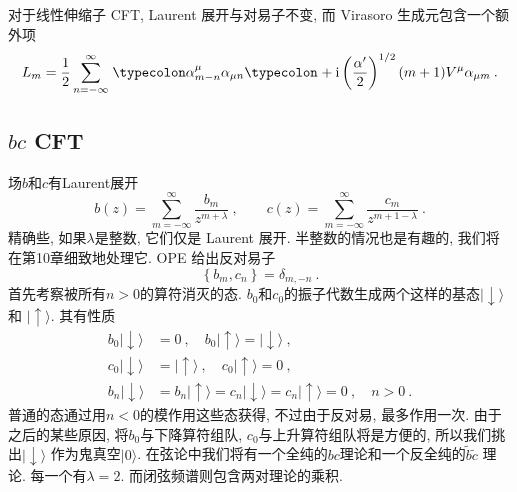 对于线性伸缩子 CFT, Laurent 展开与对易子不变, 而 Virasoro 生成元包含一个额外项
\begin{equation}
L_{m}=\frac{1}{2} \sum_{n=-\infty}^{\infty} \mathrel{\typecolon \alpha_{m-n}^{\mu} \alpha_{\mu n}\typecolon} + \:\mi\left(\frac{\alpha^{\prime}}{2}\right)^{1 / 2}(m+1) V^{\mu} \alpha_{\mu m} \:.
\end{equation}

\subsection*{ $bc$ CFT}

场$b$和$c$有Laurent展开
\begin{equation} \label{2.7.16}
b(z)=\sum_{m=-\infty}^{\infty} \frac{b_{m}}{z^{m+\lambda}}\:, \qquad c(z)=\sum_{m=-\infty}^{\infty} \frac{c_{m}}{z^{m+1-\lambda}} \:.
\end{equation}
精确些, 如果$\lambda$是整数, 它们仅是 Laurent 展开. 半整数的情况也是有趣的, 我们将在第10章细致地处理它. OPE 给出反对易子
\begin{equation}
\left\{b_{m}, c_{n}\right\}=\delta_{m,-n} \:. \label{2.7.17}
\end{equation}
首先考察被所有$n>0$的算符消灭的态. $b_0$和$c_0$的振子代数生成两个这样的基态$\lvert\downarrow\rangle$ 和 $\lvert\uparrow\rangle$. 其有性质
\begin{subequations} \label{2.7.18}
\begin{align}
b_{0}\lvert\downarrow\rangle &=0\:, \quad b_{0} \lvert \uparrow\rangle=\lvert\downarrow\rangle \:, \label{2.7.18a} \\
c_{0}\lvert\downarrow\rangle &=\lvert\uparrow\rangle \:, \quad c_{0}\lvert\uparrow\rangle=0 \:, \label{2.7.18b} \\
b_{n}\lvert\downarrow\rangle &=b_{n}\lvert\uparrow\rangle=c_{n}\lvert \downarrow\rangle=c_{n}\lvert\uparrow\rangle=0 \:, \quad n>0  \:. \label{2.7.18c}
\end{align}
\end{subequations}
普通的态通过用$n<0$的模作用这些态获得, 不过由于反对易, 最多作用一次. 由于之后的某些原因, 将$b_0$与下降算符组队, $c_0$与上升算符组队将是方便的, 所以我们挑出$\lvert \downarrow\rangle$ 作为鬼真空$|0\rangle$. 在弦论中我们将有一个全纯的$bc$理论和一个反全纯的$\tilde{b} \tilde{c}$ 理论. 每一个有$\lambda=2$. 
而闭弦频谱则包含两对理论的乘积.

